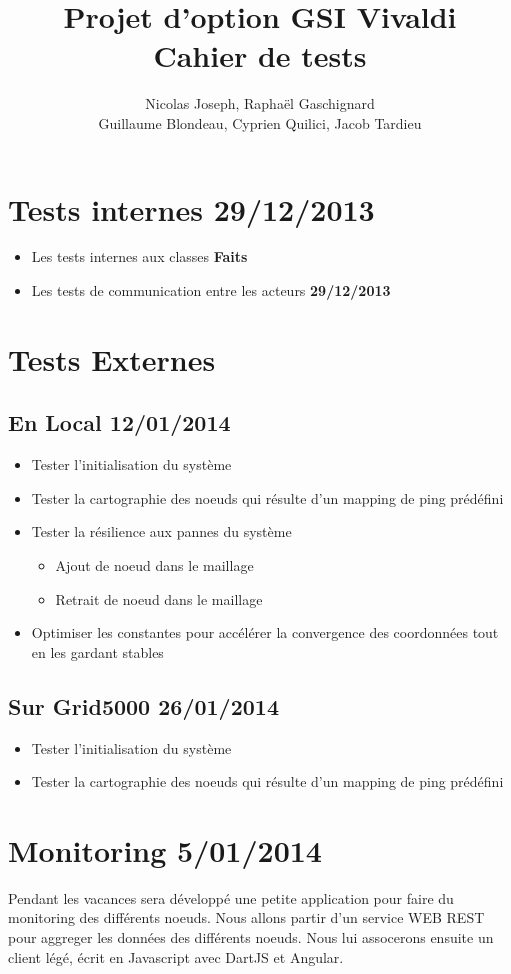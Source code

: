 \documentclass[11pt,a4paper]{article}
\title{Projet d'option GSI Vivaldi \\ Cahier de tests}
\author{Nicolas Joseph, Raphaël Gaschignard\\ Guillaume Blondeau, Cyprien Quilici, Jacob Tardieu}
\begin{document}
\maketitle

\section{Tests internes \hfill 29/12/2013}
\begin{itemize}
\item Les tests internes aux classes  \hfill \textbf{Faits}
\item Les tests de communication entre les acteurs \hfill \textbf{29/12/2013}
\end{itemize}

\section{Tests Externes}
\subsection{En Local \hfill \textbf{12/01/2014}}

\begin{itemize}
\item Tester l’initialisation du système
\item Tester la cartographie des noeuds qui résulte d’un mapping de ping prédéfini
\item Tester la résilience aux pannes du système
\begin{itemize}
\item Ajout de noeud dans le maillage
\item Retrait de noeud dans le maillage
\end{itemize}
\item Optimiser les constantes pour accélérer la convergence des coordonnées tout en les gardant stables
\end{itemize}

\subsection{Sur Grid5000  \hfill \textbf{26/01/2014}}
\begin{itemize}
\item Tester l’initialisation du système
\item Tester la cartographie des noeuds qui résulte d’un mapping de ping prédéfini
\end{itemize}

\section{Monitoring \hfill 5/01/2014}
Pendant les vacances sera développé une petite application pour faire du monitoring des différents noeuds. Nous allons partir d'un service WEB REST pour aggreger les données des différents noeuds. Nous lui assocerons ensuite un client légé, écrit en Javascript avec DartJS et Angular.
\end{document}
